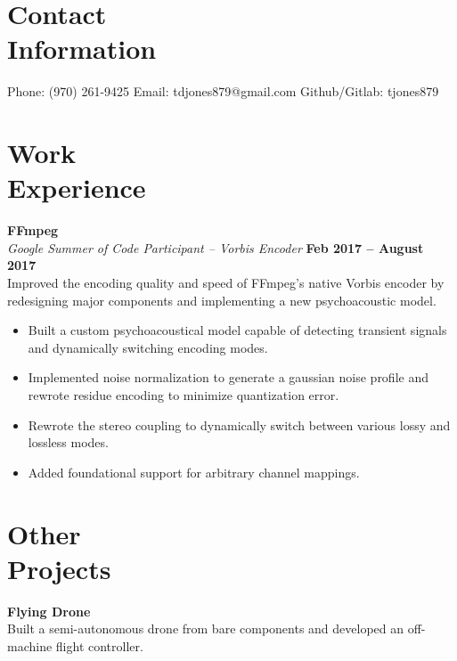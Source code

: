 \documentclass[margin,line]{resume}
\begin{document}
\begin{resume}
    \section{\mysidestyle Contact\\Information}

    Phone: (970) 261-9425 \hfill Email: tdjones879@gmail.com  \hfill Github/Gitlab: tjones879\vspace{0mm}\\\vspace{-4.5mm}

    \section{\mysidestyle Work\\Experience}

    \textbf{FFmpeg} \vspace{2mm}\\\vspace{1mm}%
    \textsl{Google Summer of Code Participant -- Vorbis Encoder} \hfill \textbf{Feb 2017 -- August 2017}\\
    Improved the encoding quality and speed of FFmpeg's native Vorbis
    encoder by redesigning major components and implementing a new
    psychoacoustic model.

	\begin{itemize}
	\item Built a custom psychoacoustical model capable of detecting
              transient signals and dynamically switching encoding modes.
	\item Implemented noise normalization to generate a gaussian noise
	      profile and rewrote residue encoding to minimize quantization
	      error.
	\item Rewrote the stereo coupling to dynamically switch between
	      various lossy and lossless modes.
	\item Added foundational support for arbitrary channel mappings.
	\end{itemize}

    \section{\mysidestyle Other\\Projects}

    \textbf{Flying Drone}\\
    Built a semi-autonomous drone from bare components and developed an
    off-machine flight controller.


\end{resume}
\end{document}
